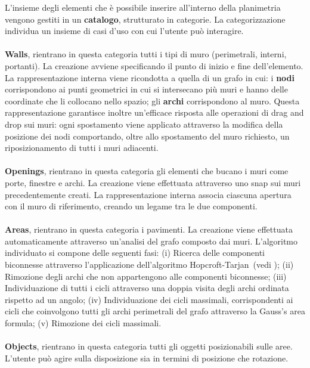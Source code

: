 L'insieme degli elementi che \`e possibile inserire all'interno della planimetria vengono gestiti in un \textbf{catalogo}, strutturato in categorie.
La categorizzazione individua un insieme di casi d'uso con cui l'utente pu\`o interagire.\\\\
\textbf{Walls}, rientrano in questa categoria tutti i tipi di muro (perimetrali, interni, portanti). La creazione avviene specificando il punto di inizio e fine dell'elemento. La rappresentazione interna viene ricondotta a quella di un grafo in cui: i \textbf{nodi} corrispondono ai punti geometrici in cui si intersecano pi\`u muri e hanno delle coordinate che li collocano nello spazio; gli \textbf{archi} corrispondono al muro. Questa rappresentazione garantisce inoltre un’efficace risposta alle operazioni di drag and drop sui muri: ogni spostamento viene applicato attraverso la modifica della posizione dei nodi comportando, oltre allo spostamento del muro richiesto, un riposizionamento di tutti i muri adiacenti.\\\\
\textbf{Openings}, rientrano in questa categoria gli elementi che bucano i muri come porte, finestre e archi. La creazione viene effettuata attraverso uno snap sui muri precedentemente creati. La rappresentazione interna associa ciascuna apertura con il muro di riferimento, creando un legame tra le due componenti.\\\\
\textbf{Areas}, rientrano in questa categoria i pavimenti. La creazione viene effettuata automaticamente attraverso un'analisi del grafo composto dai muri. L'algoritmo individuato si compone delle seguenti fasi: (i) Ricerca delle componenti biconnesse attraverso l'applicazione dell'algoritmo Hopcroft-Tarjan~(vedi \cite{Hopcroft:1973:AEA:362248.362272}); 
(ii) Rimozione degli archi che non appartengono alle componenti biconnesse; 
(iii) Individuazione di tutti i cicli attraverso una doppia visita degli archi ordinata rispetto ad un angolo;
(iv) Individuazione dei cicli massimali, corrispondenti ai cicli che coinvolgono tutti gli archi perimetrali del grafo attraverso la Gauss's area formula;
(v) Rimozione dei cicli massimali.\\\\
\textbf{Objects}, rientrano in questa categoria tutti gli oggetti posizionabili sulle aree. L'utente pu\`o agire sulla disposizione sia in termini di posizione che rotazione.\\

